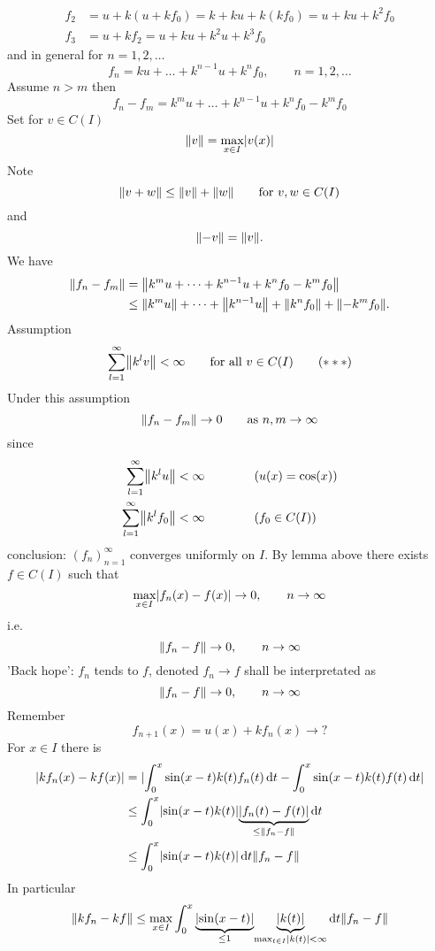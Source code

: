 \begin{enumerate}[1.]
\begin{align*}
		f_2 &= u +k (u+kf_0) = k + ku + k(kf_0) = u + ku +k^2f_0 \\
		f_3 &= u + kf_2 = u + ku + k^2u + k^3f_0
	\end{align*}
	and in general for $n=1,2,\dots$
	\[
		f_n = ku + \dots + k^{n-1}u + k^n f_0, \qquad n=1,2,\dots
	\]
	Assume $n>m$ then
	\[
		f_n-f_m = k^mu + \dots + k^{n-1}u + k^nf_0 - k^mf_0
	\]
	Set for $v \in C(I)$
	\[
		\norm{v} = \max_{x \in I}\abs{v(x)}
	\]
	Note
	\[
		\norm{v+w} \leq \norm{v} + \norm{w} \qquad \text{for }v,w \in C(I)
	\]
	and
	\[
		\norm{-v}=\norm{v}.
	\]
	We have
	\begin{align*}
		\norm{f_n-f_m} &= \norm{k^mu + \dots + k^{n-1}u + k^nf_0 - k^m f_0} \\
		&\leq \norm{k^mu} + \dots + \norm{ k^{n-1}u} + \norm{k^nf_0} + \norm{- k^mf_0}.
	\end{align*}
	Assumption
	\[
		\sum_{l=1}^{\infty} \norm{k^lv} < \infty \qquad \text{for all }v \in C(I) \qquad (***)
	\]
	Under this assumption
	\[
		\norm{f_n-f_m} \to 0 \qquad \text{as }n,m \to \infty
	\]
	since
	\begin{align*}
		\sum_{l=1}^{\infty}\norm{k^lu} &< \infty \qquad \qquad (u(x)=\cos(x)) \\
		\sum_{l=1}^{\infty}\norm{k^lf_0} &< \infty \qquad \qquad (f_0 \in C(I))
	\end{align*}
	conclusion: $(f_n)_{n=1}^{\infty}$ converges uniformly on $I$. By lemma above there exists $f \in C(I)$ such that
	\[
		\max_{x \in I}\lvert f_n(x)-f(x)\rvert \to 0, \qquad n \to \infty
	\]
	i.e.
	\[
		\norm{f_n -f} \to 0, \qquad n \to \infty
	\]
	'Back hope':
	$f_n$ tends to $f$, denoted $f_n \to f$ shall be interpretated as
	\[
		\norm{f_n -f} \to 0, \qquad n \to \infty
	\]
	Remember
	\[
		f_{n+1}(x) = u(x) + k f_n(x) \to ?
	\]
	For $x \in I$ there is
	\begin{align*}
		\abs{k f_n(x)- kf(x)} &= \abs{ \int_{0}^{x} \sin(x-t)k(t)f_n(t) \,\mathrm{d}t- \int_{0}^{x}\sin(x-t)k(t)f(t) \,\mathrm{d}t} \\
		&\leq \int_{0}^{x}\abs{\sin(x-t)k(t)}\underset{\leq \norm{f_n-f}}{\underbrace{\abs{f_n(t)-f(t)}}} \,\mathrm{d}t \\
		&\leq \int_{0}^{x}\abs{\sin(x-t)k(t)} \,\mathrm{d}t \norm{f_n-f}
	\end{align*}
	In particular
	\begin{align*}
		\norm{k f_n- kf} &\leq \max_{x \in I}\int_{0}^{x} \underset{\leq 1}{\underbrace{\abs{\sin(x-t)}}} \underset{\max_{t \in I}\abs{k(t)}< \infty}{\underbrace{\abs{k(t)}}} \,\mathrm{d}t \norm{f_n -f} \\

\end{align*}
\end{enumerate}
